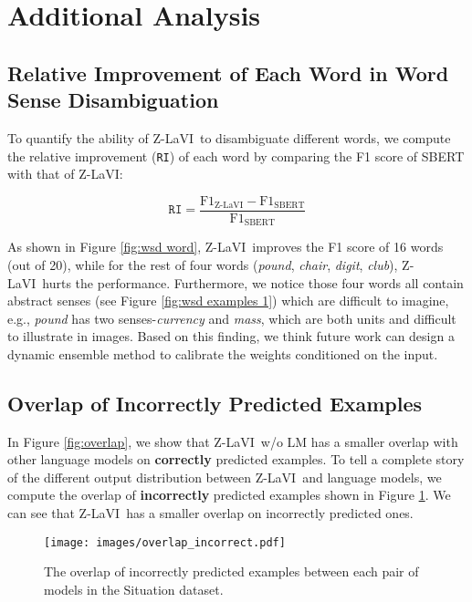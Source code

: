 \documentclass[11pt]{article}
\newcommand{\model}{Z-LaVI}
\begin{document}
\section{Additional Analysis}
\subsection{Relative Improvement of Each Word in Word Sense Disambiguation}
To quantify the ability of \model~to disambiguate different words, we compute the relative improvement (\texttt{RI}) of each word by comparing the F1 score of SBERT with that of \model:

\begin{equation}
    \texttt{RI} = \frac{\text{F1}_{\text{\model}} - \text{F1}_{\text{SBERT}}}{\text{F1}_{\text{SBERT}}}
\end{equation}

As shown in Figure \ref{fig:wsd word}, \model~improves the F1 score of 16 words (out of 20), while for the rest of four words (\textit{pound}, \textit{chair}, \textit{digit}, \textit{club}), \model~hurts the performance. Furthermore, we notice those four words all contain abstract senses (see Figure \ref{fig:wsd examples 1}) which are difficult to imagine, e.g., \textit{pound} has two senses-\textit{currency} and \textit{mass}, which are both units and difficult to illustrate in images. Based on this finding, we think future work can design a dynamic ensemble method to calibrate the weights conditioned on the input.

\subsection{Overlap of Incorrectly Predicted Examples}
In Figure \ref{fig:overlap}, we show that \model~w/o LM has a smaller overlap with other language models on \textbf{correctly} predicted examples. To tell a complete story of the different output distribution between \model~and language models, we compute the overlap of \textbf{incorrectly} predicted examples shown in Figure \ref{fig:overlap_incorrect}. We can see that \model~has a smaller overlap on incorrectly predicted ones.

\begin{figure}[!htbp]
\centering
    \texttt{[image: images/overlap\_incorrect.pdf]}
    \caption{The overlap of incorrectly predicted examples between each pair of models in the Situation dataset.}
    \label{fig:overlap_incorrect}
\end{figure}
\end{document}

